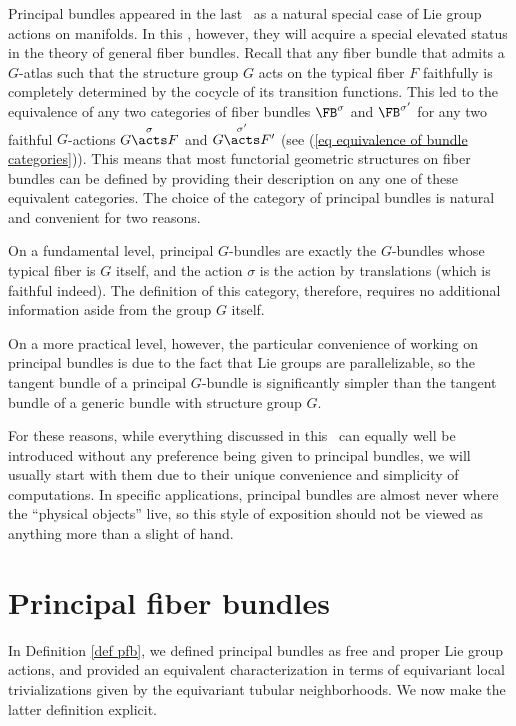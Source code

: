     Principal bundles appeared in the last \chap\ as a natural special case of Lie group actions on manifolds. In this \chap, however, they will acquire a special elevated status in the theory of general fiber bundles. Recall that any fiber bundle that admits a $G$-atlas such that the structure group $G$ acts on the typical fiber $F$ faithfully is completely determined by the cocycle of its transition functions. This led to the equivalence of any two categories of fiber bundles $\FB^\sigma$ and $\FB^{\sigma'}$ for any two faithful $G$-actions $G\overset{\sigma}{\acts}F$ and $G\overset{\sigma'}{\acts}F'$ (see (\ref{eq equivalence of bundle categories})). This means that most functorial geometric structures on fiber bundles can be defined by providing their description on any one of these equivalent categories. The choice of the category of principal bundles is natural and convenient for two reasons. 
    
    On a fundamental level, principal $G$-bundles are exactly the $G$-bundles whose typical fiber is $G$ itself, and the action $\sigma$ is the action by translations (which is faithful indeed). The definition of this category, therefore, requires no additional information aside from the group $G$ itself. 
    
    On a more practical level, however, the particular convenience of working on principal bundles is due to the fact that Lie groups are parallelizable, so the tangent bundle of a principal $G$-bundle is significantly simpler than the tangent bundle of a generic bundle with structure group $G$. 

    For these reasons, while everything discussed in this \chap\ can equally well be introduced without any preference being given to principal bundles, we will usually start with them due to their unique convenience and simplicity of computations. In specific applications, principal bundles are almost never where the ``physical objects'' live, so this style of exposition should not be viewed as anything more than a slight of hand.



\section{Principal fiber bundles}\label{sec: principal bundles}


In Definition \ref{def pfb}, we defined principal bundles as free and proper Lie group actions, and provided an equivalent characterization in terms of equivariant local trivializations given by the equivariant tubular neighborhoods. We now make the latter definition explicit.

